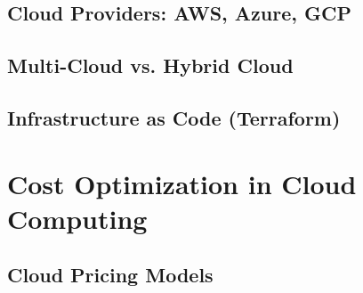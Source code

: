\subsection{Cloud Providers: AWS, Azure, GCP}

\subsection{Multi-Cloud vs. Hybrid Cloud}

\subsection{Infrastructure as Code (Terraform)}

\section{Cost Optimization in Cloud Computing}

\subsection{Cloud Pricing Models}


